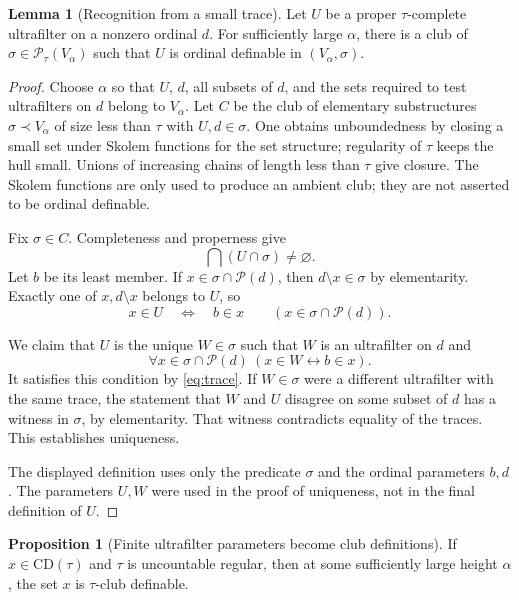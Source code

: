 \documentclass[11pt,letterpaper]{article}
\theoremstyle{definition}
\newtheorem{proposition}[definition]{Proposition}
\newtheorem{lemma}[definition]{Lemma}
\newcommand{\CD}{\mathrm{CD}}
\newcommand{\PP}{\mathcal P}
\begin{document}
\begin{lemma}[Recognition from a small trace]\label{lem:recognition}
Let $U$ be a proper $\tau$-complete ultrafilter on a nonzero ordinal $d$. For sufficiently large $\alpha$, there is a club of $\sigma\in\PP_\tau(V_\alpha)$ such that $U$ is ordinal definable in $(V_\alpha,\sigma)$.
\end{lemma}

\begin{proof}
Choose $\alpha$ so that $U$, $d$, all subsets of $d$, and the sets required to test ultrafilters on $d$ belong to $V_\alpha$. Let $C$ be the club of elementary substructures $\sigma\prec V_\alpha$ of size less than $\tau$ with $U,d\in\sigma$. One obtains unboundedness by closing a small set under Skolem functions for the set structure; regularity of $\tau$ keeps the hull small. Unions of increasing chains of length less than $\tau$ give closure. The Skolem functions are only used to produce an ambient club; they are not asserted to be ordinal definable.

Fix $\sigma\in C$. Completeness and properness give
\[
 \bigcap(U\cap\sigma)\neq\varnothing.
\]
Let $b$ be its least member. If $x\in\sigma\cap\PP(d)$, then $d\setminus x\in\sigma$ by elementarity. Exactly one of $x,d\setminus x$ belongs to $U$, so
\begin{equation}\label{eq:trace}
 x\in U\quad\Longleftrightarrow\quad b\in x
 \qquad(x\in\sigma\cap\PP(d)).
\end{equation}

We claim that $U$ is the unique $W\in\sigma$ such that $W$ is an ultrafilter on $d$ and
\[
 \forall x\in\sigma\cap\PP(d)\ (x\in W\leftrightarrow b\in x).
\]
It satisfies this condition by \eqref{eq:trace}. If $W\in\sigma$ were a different ultrafilter with the same trace, the statement that $W$ and $U$ disagree on some subset of $d$ has a witness in $\sigma$, by elementarity. That witness contradicts equality of the traces. This establishes uniqueness.

The displayed definition uses only the predicate $\sigma$ and the ordinal parameters $b,d$. The parameters $U,W$ were used in the proof of uniqueness, not in the final definition of $U$.
\end{proof}

\begin{proposition}[Finite ultrafilter parameters become club definitions]\label{prop:club-CD}
If $x\in\CD(\tau)$ and $\tau$ is uncountable regular, then at some sufficiently large height $\alpha$, the set $x$ is $\tau$-club definable.
\end{proposition}
\end{document}
